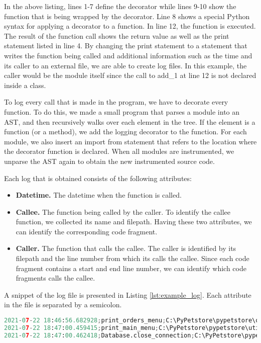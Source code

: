 In the above listing, lines 1-7 define the decorator while lines 9-10 show the function that is being wrapped by the decorator. Line 8 shows a special Python syntax for applying a decorator to a function. In line 12, the function is executed. The result of the function call shows the return value as well as the print statement listed in line 4. By changing the print statement to a statement that writes the function being called and additional information such as the time and its caller to an external file, we are able to create log files. 
In this example, the caller would be the module itself since the call to add\_1 at line 12 is not declared inside a class.\par
To log every call that is made in the program, we have to decorate every function. To do this, we made a small program that parses a module into an AST, and then recursively walks over each element in the tree. If the element is a function (or a method), we add the logging decorator to the function. For each module, we also insert an import from statement that refers to the location where the decorator function is declared. When all modules are instrumented, we unparse the AST again to obtain the new instrumented source code. \par
Each log that is obtained consists of the following attributes:

\begin{itemize}
    \item \textbf{Datetime.} The datetime when the function is called.
    \item \textbf{Callee.} The function being called by the caller. To identify the callee function, we collected its name and filepath. Having these two attributes, we can identify the corresponding code fragment.
    \item \textbf{Caller.} The function that calls the callee. The caller is identified by its filepath and the line number from which its calls the callee. Since each code fragment contains a start and end line number, we can identify which code fragments calls the callee.
\end{itemize}

A snippet of the log file is presented in Listing \ref{lst:example_log}. Each attribute in the file is separated by a semicolon. 

\begin{lstlisting}[language=Python, caption=Snippet from a log file, label={lst:example_log}]
2021-07-22 18:46:56.682928;print_orders_menu;C:\PyPetstore\pypetstore\order.py;<module>;19;C:\PyPetstore\pypetstore\main.py
2021-07-22 18:47:00.459415;print_main_menu;C:\PyPetstore\pypetstore\util.py;<module>;15;C:\PyPetstore\pypetstore\main.py
2021-07-22 18:47:00.462418;Database.close_connection;C:\PyPetstore\pypetstore\database.py;<module>;70;C:\PyPetstore\pypetstore\main.py
\end{lstlisting}


